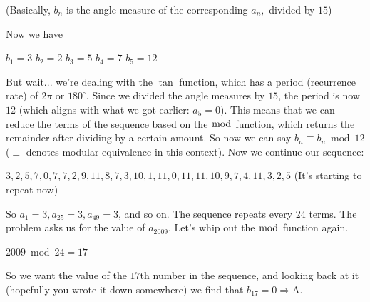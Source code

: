 \begin{enumerate}
 
(Basically, $b_n$ is the angle measure of the corresponding $a_n,$ divided by $15$)

 Now we have

 
$b_1 = 3$
$b_2 = 2$
$b_3 = 5$
$b_4 = 7$
$b_5 = 12$

 
But wait... we're dealing with the $\tan$ function, which has a period (recurrence rate) of $2\pi$ or $180^{\circ}$. Since we divided the angle measures by $15$, the period is now $12$ (which aligns with what we got earlier: $a_5 = 0$). This means that we can reduce the terms of the sequence based on the $\bmod$ function, which returns the remainder after dividing by a certain amount. So now we can say $b_n \equiv b_n \bmod{12}$ ($\equiv$ denotes modular equivalence in this context). Now we continue our sequence:

 $3, 2, 5, 7, 0, 7, 7, 2, 9, 11, 8, 7, 3, 10, 1, 11, 0, 11, 11, 10, 9, 7, 4, 11, 3, 2, 5$ (It's starting to repeat now)

 So $a_1  = 3, a_{25} = 3, a_{49} = 3$, and so on. The sequence repeats every $24$ terms. The problem asks us for the value of $a_{2009}$. Let's whip out the $\bmod$ function again.

 
$2009 \bmod 24 = 17$

 
So we want the value of the $17$th number in the sequence, and looking back at it (hopefully you wrote it down somewhere) we find that $b_{17} = 0 \Rightarrow \boxed{\text{A}}$.

 


\end{enumerate}